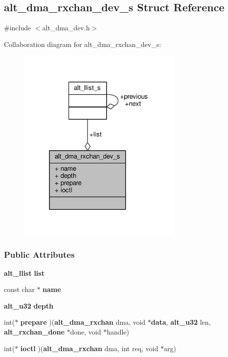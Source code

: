 \subsection{alt\+\_\+dma\+\_\+rxchan\+\_\+dev\+\_\+s Struct Reference}
\label{structalt__dma__rxchan__dev__s}


{\ttfamily \#include $<$alt\+\_\+dma\+\_\+dev.\+h$>$}



Collaboration diagram for alt\+\_\+dma\+\_\+rxchan\+\_\+dev\+\_\+s\+:
\nopagebreak
\begin{figure}[H]
\begin{center}
\leavevmode
\includegraphics[width=232pt]{d1/da7/structalt__dma__rxchan__dev__s__coll__graph}
\end{center}
\end{figure}
\subsubsection*{Public Attributes}
\begin{DoxyCompactItemize}
\item 
{\bf alt\+\_\+llist} {\bf list}
\item 
const char $\ast$ {\bf name}
\item 
{\bf alt\+\_\+u32} {\bf depth}
\item 
int($\ast$ {\bf prepare} )({\bf alt\+\_\+dma\+\_\+rxchan} dma, void $\ast${\bf data}, {\bf alt\+\_\+u32} len, {\bf alt\+\_\+rxchan\+\_\+done} $\ast$done, void $\ast$handle)
\item 
int($\ast$ {\bf ioctl} )({\bf alt\+\_\+dma\+\_\+rxchan} dma, int req, void $\ast$arg)
\end{DoxyCompactItemize}


